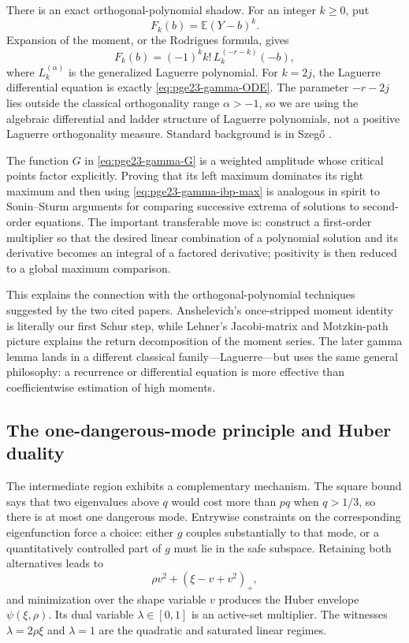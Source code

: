 \documentclass[11pt]{article}
\numberwithin{equation}{section}
\newcommand{\E}{\mathbb E}
\begin{document}
There is an exact orthogonal-polynomial shadow.  For an integer $k\ge0$,
put
\[
  F_k(b)=\E(Y-b)^k.
\]
Expansion of the moment, or the Rodrigues formula, gives
\begin{equation}\label{eq:Laguerre-identity}
  F_k(b)=(-1)^k k!\,L_k^{(-r-k)}(-b),
\end{equation}
where $L_k^{(\alpha)}$ is the generalized Laguerre polynomial.  For
$k=2j$, the Laguerre differential equation is exactly
\eqref{eq:pge23-gamma-ODE}.  The parameter $-r-2j$ lies outside the classical
orthogonality range $\alpha>-1$, so we are using the algebraic differential
and ladder structure of Laguerre polynomials, not a positive Laguerre
orthogonality measure.  Standard background is in Szeg\H{o}
\cite{Szego1975}.

The function $G$ in \eqref{eq:pge23-gamma-G} is a weighted amplitude whose
critical points factor explicitly.  Proving that its left maximum dominates
its right maximum and then using \eqref{eq:pge23-gamma-ibp-max} is analogous in
spirit to Sonin--Sturm arguments for comparing successive extrema of
solutions to second-order equations.  The important transferable move is:
construct a first-order multiplier so that the desired linear combination
of a polynomial solution and its derivative becomes an integral of a
factored derivative; positivity is then reduced to a global maximum
comparison.

This explains the connection with the orthogonal-polynomial techniques
suggested by the two cited papers.  Anshelevich's once-stripped moment
identity is literally our first Schur step, while Lehner's Jacobi-matrix and
Motzkin-path picture explains the return decomposition of the moment series.
The later gamma lemma lands in a different classical family---Laguerre---but
uses the same general philosophy: a recurrence or differential equation is
more effective than coefficientwise estimation of high moments.

\subsection{The one-dangerous-mode principle and Huber duality}

The intermediate region exhibits a complementary mechanism.  The square
bound says that two eigenvalues above $q$ would cost more than $pq$ when
$q>1/3$, so there is at most one dangerous mode.  Entrywise constraints on
the corresponding eigenfunction force a choice: either $g$ couples
substantially to that mode, or a quantitatively controlled part of $g$
must lie in the safe subspace.  Retaining both alternatives leads to
\[
  \rho v^2+(\xi-v+v^2)_+,
\]
and minimization over the shape variable $v$ produces the Huber envelope
$\psi(\xi,\rho)$.  Its dual variable $\lambda\in[0,1]$ is an active-set
multiplier.  The witnesses $\lambda=2\rho\xi$ and $\lambda=1$ are the
quadratic and saturated linear regimes.
\end{document}

